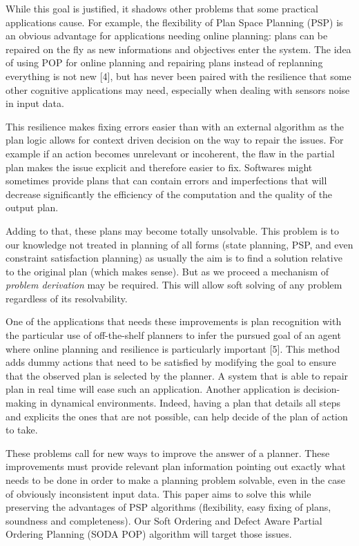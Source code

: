 \documentclass[]{article}
\begin{document}
While this goal is justified, it shadows other problems that some
practical applications cause. For example, the flexibility of Plan Space
Planning (PSP) is an obvious advantage for applications needing online
planning: plans can be repaired on the fly as new informations and
objectives enter the system. The idea of using POP for online planning
and repairing plans instead of replanning everything is not new {[}4{]},
but has never been paired with the resilience that some other cognitive
applications may need, especially when dealing with sensors noise in
input data.

This resilience makes fixing errors easier than with an external
algorithm as the plan logic allows for context driven decision on the
way to repair the issues. For example if an action becomes unrelevant or
incoherent, the flaw in the partial plan makes the issue explicit and
therefore easier to fix. Softwares might sometimes provide plans that
can contain errors and imperfections that will decrease significantly
the efficiency of the computation and the quality of the output plan.

Adding to that, these plans may become totally unsolvable. This problem
is to our knowledge not treated in planning of all forms (state
planning, PSP, and even constraint satisfaction planning) as usually the
aim is to find a solution relative to the original plan (which makes
sense). But as we proceed a mechanism of \emph{problem derivation} may
be required. This will allow soft solving of any problem regardless of
its resolvability.

One of the applications that needs these improvements is plan
recognition with the particular use of off-the-shelf planners to infer
the pursued goal of an agent where online planning and resilience is
particularly important {[}5{]}. This method adds dummy actions that need
to be satisfied by modifying the goal to ensure that the observed plan
is selected by the planner. A system that is able to repair plan in real
time will ease such an application. Another application is
decision-making in dynamical environments. Indeed, having a plan that
details all steps and explicits the ones that are not possible, can help
decide of the plan of action to take.

These problems call for new ways to improve the answer of a planner.
These improvements must provide relevant plan information pointing out
exactly what needs to be done in order to make a planning problem
solvable, even in the case of obviously inconsistent input data. This
paper aims to solve this while preserving the advantages of PSP
algorithms (flexibility, easy fixing of plans, soundness and
completeness). Our Soft Ordering and Defect Aware Partial Ordering
Planning (SODA POP) algorithm will target those issues.
\end{document}
